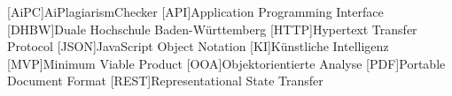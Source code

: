 \addchap*{\langacronyms}
\begin{acronym}
    [AiPC]{AiPlagiarismChecker}
    [API]{Application Programming Interface}
    [DHBW]{Duale Hochschule Ba\-den-\-Würt\-tem\-berg}
    [HTTP]{Hypertext Transfer Protocol}
    [JSON]{JavaScript Object Notation}
    [KI]{Künstliche Intelligenz}
    [MVP]{Minimum Viable Product}
    [OOA]{Objektorientierte Analyse}
    [PDF]{Portable Document Format}
    [REST]{Representational State Transfer}
\end{acronym}